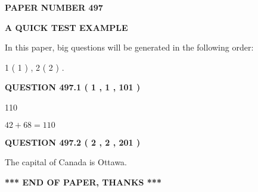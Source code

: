 \documentclass[12pt]{article}
\begin{document}
   
   
   
 {\textbf{ \Large{ PAPER NUMBER  497  }}}
   
   
\vspace{0.2in}
   
   
   
   
   
   
 \vspace{0.2in}
{\LARGE {\textbf{ A QUICK TEST EXAMPLE}}}
   
   
   
\vspace{0.2in}
   
In this paper, big questions will be generated in the following order: 
   
   
   1 ( 1 )
 ,
   2 ( 2 )
 .
  
\vspace{0.2in}
  
{\textbf{\Large{QUESTION
497.1 
 ( 1 , 1 , 101 )
}}}
  
  
 
 
\noindent{}

110
 
 
 
 
\noindent{}

$ %
42 +  %
68=   %
110$
 
 
  
\vspace{0.2in}
  
{\textbf{\Large{QUESTION
497.2 
 ( 2 , 2 , 201 )
}}}
  
  
 
 
\noindent{}
 
 
The capital of Canada is Ottawa.
 
 
 
 
   
   
 \vspace{0.2in}
 
   
   
   
   
\vspace{1.0in} 
{\textbf{\large{ *** END OF PAPER, THANKS *** }}} 
   
\end{document}
